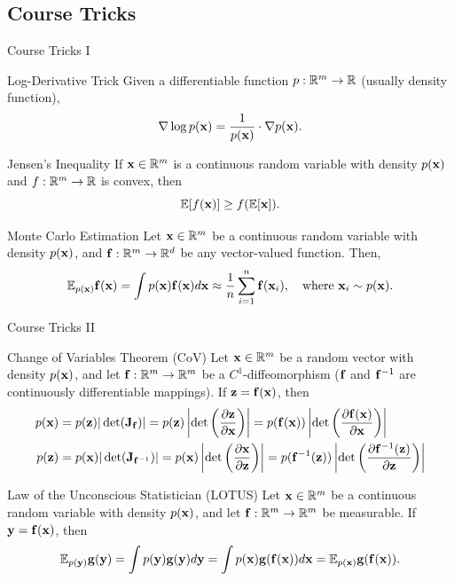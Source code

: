 \documentclass{beamer}
\renewcommand{\eqpause}{}
\renewcommand{\nextonslide}[1]{#1}
\begin{document}
\subsection{Course Tricks}
\begin{frame}{Course Tricks I}
	\begin{block}{Log-Derivative Trick}
		Given a differentiable function $p: \mathbb{R}^m \to \mathbb{R}$ (usually density function),
		$$
			\nabla \log p(\mathbf{x}) = \frac{1}{p(\mathbf{x})} \cdot \nabla p(\mathbf{x}).
		$$
		\vspace{-0.5cm}
	\end{block}
    \eqpause
	\begin{block}{Jensen's Inequality}
		If $\mathbf{x} \in \mathbb{R}^m$ is a continuous random variable with density $p(\mathbf{x})$ and $f: \mathbb{R}^m \to \mathbb{R}$ is convex, then
		$$
			\mathbb{E}[f(\mathbf{x})] \geq f(\mathbb{E}[\mathbf{x}]).
		$$
		\vspace{-0.7cm}
	\end{block}
    \eqpause
	\begin{block}{Monte Carlo Estimation}
		Let $\mathbf{x} \in \mathbb{R}^m$ be a continuous random variable with density $p(\mathbf{x})$, and $\mathbf{f}: \mathbb{R}^m \to \mathbb{R}^d$ be any vector-valued function. Then,
		$$
			\mathbb{E}_{p(\mathbf{x})} \mathbf{f}(\mathbf{x}) = \int p(\mathbf{x}) \mathbf{f}(\mathbf{x}) d \mathbf{x} \approx \frac{1}{n} \sum_{i=1}^n \mathbf{f}(\mathbf{x}_i), \quad 
			\text{where } \mathbf{x}_i \sim p(\mathbf{x}).
		$$
		\vspace{-0.4cm}
	\end{block}
\end{frame}
\begin{frame}{Course Tricks II}
	\begin{block}{Change of Variables Theorem (CoV)}
		Let $\mathbf{x}\in \mathbb{R}^m$ be a random vector with density $p(\mathbf{x})$, and let $\mathbf{f}: \mathbb{R}^m \rightarrow \mathbb{R}^m$ be a $C^1$-diffeomorphism ($\mathbf{f}$ and $\mathbf{f}^{-1}$ are continuously differentiable mappings). 
		If $\mathbf{z} = \mathbf{f}(\mathbf{x})$, then
		\begin{align*}
			p(\bx) &= p(\bz) |\det(\bJ_{\bff})| = p(\bz) \left|\det \left( \frac{\partial \bz}{\partial \bx} \right) \right| 
			\nextonslide{= p(\bff(\bx)) \left|\det \left(  \frac{\partial \bff(\bx)}{\partial \bx} \right) \right|} \\
			\nextonslide{p(\bz) &= p(\bx) |\det(\bJ_{\bff^{-1}})| = p(\bx) \left|\det \left(  \frac{\partial \bx}{\partial \bz} \right) \right| 
			= p(\bff^{-1}(\bz)) \left|\det \left(  \frac{\partial \bff^{-1}(\bz)}{\partial \bz} \right) \right| }
		\end{align*}
		\vspace{-0.5cm}
	\end{block}
    \eqpause
	\begin{block}{Law of the Unconscious Statistician (LOTUS)}
		Let $\mathbf{x} \in \mathbb{R}^m$ be a continuous random variable with density $p(\mathbf{x})$, and let $\mathbf{f}: \mathbb{R}^m \to \mathbb{R}^m$ be measurable. If $\mathbf{y} = \mathbf{f}(\mathbf{x})$, then
		$$
			\bbE_{p(\by)} \bg(\by) = \int p(\by) \bg(\by) d\by \nextonslide{= \int p(\bx) \bg(\bff(\bx)) d\bx = \bbE_{p(\bx)} \bg(\bff(\bx))}.
		$$
		\vspace{-0.4cm}
	\end{block}
\end{frame}
\end{document}

